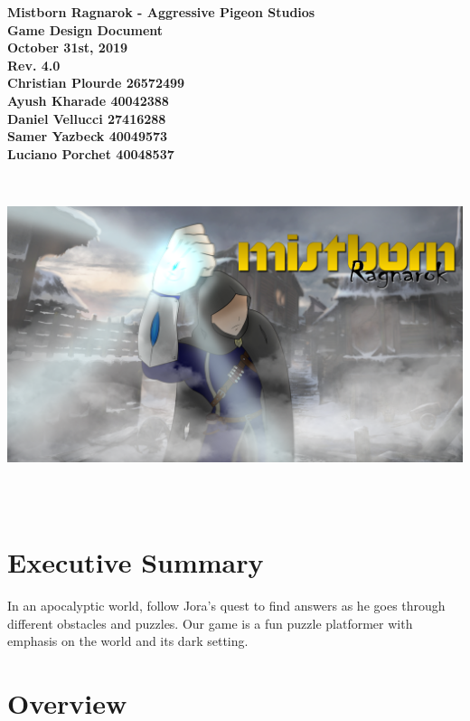\documentclass{article}
\begin{document}
\begin{titlepage}
    \centering
    \vfill
    {\bfseries\Large
        Mistborn Ragnarok - Aggressive Pigeon Studios\\
        Game Design Document\\
        October 31st, 2019\\
        Rev. 4.0\\

        \vskip1cm
        Christian Plourde 26572499\\
		Ayush Kharade 40042388\\
		Daniel Vellucci 27416288\\
		Samer Yazbeck 40049573\\
		Luciano Porchet 40048537\\
    }    
    \vfill
    \includegraphics[width=14cm, height=10cm]{Box_Art.png} %
    \vfill
    \vfill
\end{titlepage}

\newpage

\section{Executive Summary}
In an apocalyptic world, follow Jora's quest to find answers as he goes through different obstacles and puzzles. Our game is a fun puzzle platformer with emphasis on the world and its dark setting.

\section{Overview}
\end{document}
